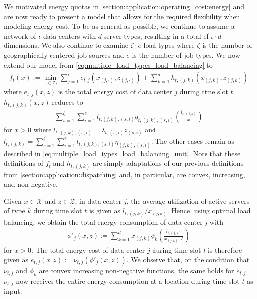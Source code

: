 We motivated energy quotas in \cref{section:application:operating_cost:energy} and are now ready to present a model that allows for the required flexibility when modeling energy cost. To be as general as possible, we continue to assume a network of $\iota$ data centers with $d$ server types, resulting in a total of $\iota \cdot d$ dimensions. We also continue to examine $\zeta \cdot e$ load types where $\zeta$ is the number of geographically centered job sources and $e$ is the number of job types. We now extend our model from \cref{eq:multiple_load_types_load_balancing} to \begin{align*}
    f_t(x) := \min_{z \in \mathcal{Z}_t} \sum_{j=1}^{\iota} e_{t,j}(x_{(j,\cdot)},z_{(j,\cdot)}) + \sum_{k=1}^{d} h_{t,(j,k)}(x_{(j,k)},z_{(j,k)})
\end{align*} where $e_{t,j}(x,z)$ is the total energy cost of data center $j$ during time slot $t$. $h_{t,(j,k)}(x,z)$ reduces to \begin{align*}
    \sum_{s=1}^{\zeta} \sum_{i=1}^e l_{t,(j,k),(s,i)} q_{t,(j,k),(s,i)}\left(\frac{l_{t,(j,k)}}{x}\right)
\end{align*} for $x > 0$ where $l_{t,(j,k),(s,i)} = \lambda_{t,(s,i)} z_{(s,i)}$ and $l_{t,(j,k)} = \sum_{s=1}^{\zeta} \sum_{i=1}^e l_{t,(j,k),(s,i)} \eta_{(j,k),(s,i)}$. The other cases remain as described in \cref{eq:multiple_load_types_load_balancing_unit}. Note that these definitions of $f_t$ and $h_{t,(j,k)}$ are simply adaptations of our previous definitions from \cref{section:application:dispatching} and, in particular, are convex, increasing, and non-negative.

Given $x \in \mathcal{X}$ and $z \in \mathcal{Z}$, in data center $j$, the average utilization of active servers of type $k$ during time slot $t$ is given as $l_{t,(j,k)} / x_{(j,k)}$. Hence, using optimal load balancing, we obtain the total energy consumption of data center $j$ with \begin{align*}
    \phi'_j(x,z) := \sum_{k=1}^{d} x_{(j,k)} \phi_{k}\left(\frac{l_{t,(j,k)}}{x_{(j,k)} \cdot \delta}\right)
\end{align*} for $x > 0$. The total energy cost of data center $j$ during time slot $t$ is therefore given as $e_{t,j}(x,z) := \nu_{t,j}(\phi'_j(x,z))$. We observe that, on the condition that $\nu_{t,j}$ and $\phi_k$ are convex increasing non-negative functions, the same holds for $e_{t,j}$. $\nu_{t,j}$ now receives the entire energy consumption at a location during time slot $t$ as input.

